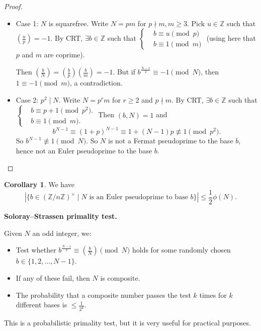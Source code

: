 \documentclass{article}
\theoremstyle{definition}
\newtheorem{cor}[theorem]{Corollary}
\begin{document}
\begin{proof}
    \begin{itemize}
        \item Case 1: $N$ is squarefree. Write $N=pm$ for $p \nmid m, m\ge 3$. Pick $u \in \mathbb{Z}$ such that $\left( \frac{u}{p} \right) =-1$. By CRT, $\exists b \in \mathbb{Z}$ such that $\begin{cases}
            &b \equiv u \pmod{p}\\
            &b \equiv 1 \pmod{m}
        \end{cases}$ (using here that $p$ and $m$ are coprime).
        \vspace{1mm}
        
        Then $\left( \frac{b}{N} \right) = \left( \frac{b}{p} \right) \left( \frac{b}{m} \right) = -1$. But if $b^{\frac{N-1}{2}} \equiv -1 \pmod{N}$, then $1 \equiv -1 \pmod{m}$, a contradiction.
        \item Case 2: $p^2 \mid N$. Write $N=p^r m$ for $r\ge 2$ and $p \nmid m$. By CRT, $\exists b \in\mathbb{Z}$ such that $\begin{cases}
            &b \equiv p+1 \pmod{p^2}.\\
            &b \equiv 1 \pmod{m}.
        \end{cases}$
        Then $(b,N)=1$ and \[
        b^{N-1} \equiv (1+p)^{N-1} \equiv 1 + (N-1)p \not\equiv  1 \pmod{p^2}.
        \]
        So $b^{N-1} \not\equiv 1 \pmod{N}$. So $N$ is not a Fermat pseudoprime to the base $b$, hence not an Euler pseudoprime to the base $b$.
    \end{itemize}
\end{proof}
\begin{cor}
    We have \[
    \left|\{b \in (\mathbb{Z}/n\mathbb{Z})^\times \mid N \text{ is an Euler pseudoprime to base }b\}\right| \le \frac{1}{2}\phi(N).
    \]
\end{cor}
\textbf{Soloray--Strassen primality test.}
\vspace{1mm}

Given $N$ an odd integer, we:
\begin{itemize}
    \item Test whether $b^{\frac{N-1}{2}} \equiv \left( \frac{b}{N} \right) \pmod{N}$ holds for some randomly chosen $b \in \{1,2,\ldots,N-1\}$.
    \item If any of these fail, then $N$ is composite.
    \item The probability that a composite number passes the test $k$ times for $k$ different bases is $\le \frac{1}{2^k}$.
\end{itemize} 
This is a probabilistic primality test, but it is very useful for practical purposes.
\vspace{1mm}
\end{document}
